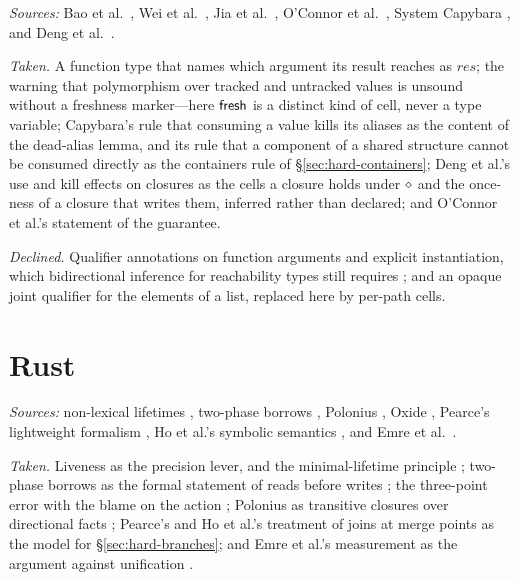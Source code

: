 \emph{Sources:} Bao et al.\ \citep{bao2021reachability}, Wei et al.\ \citep{wei2024polymorphic}, Jia et
al.\ \citep{jia2026escape}, O'Connor et al.\ \citep{oconnor2026separation}, System Capybara
\citep{xu2026capybara}, and Deng et al.\ \citep{deng2025capture}.

\emph{Taken.} A function type that names which argument its result reaches \citep[\S2.2]{wei2024polymorphic}
as $\mathit{res}$; the warning that polymorphism over tracked and untracked values is unsound without a
freshness marker---here $\mathsf{fresh}$ is a distinct kind of cell, never a type variable; Capybara's rule that
consuming a value kills its aliases as the content of the dead-alias lemma, and its rule that a component
of a shared structure cannot be consumed directly as the containers rule of \S\ref{sec:hard-containers};
Deng et al.'s use and kill effects on closures \citep[Fig.~1]{deng2025capture} as the cells a closure
holds under $\diamond$ and the once-ness of a closure that writes them, inferred rather than declared; and
O'Connor et al.'s statement of the guarantee.

\emph{Declined.} Qualifier annotations on function arguments and explicit instantiation, which
bidirectional inference for reachability types still requires \citep{jia2026escape}; and an opaque joint
qualifier for the elements of a list, replaced here by per-path cells.

\section{Rust}

\emph{Sources:} non-lexical lifetimes \citep{rfc2094}, two-phase borrows \citep{rfc2025}, Polonius
\citep{matsakis2018alias,stjerna2020polonius}, Oxide \citep{weiss2019oxide}, Pearce's lightweight formalism
\citep{pearce2021lightweight}, Ho et al.'s symbolic semantics \citep{ho2024sound}, and Emre et al.\
\citep{emre2023aliasing}.

\emph{Taken.} Liveness as the precision lever, and the minimal-lifetime principle \citep{rfc2094};
two-phase borrows as the formal statement of reads before writes \citep{rfc2025}; the three-point error
with the blame on the action \citep{rfc2094}; Polonius as transitive closures over directional facts
\citep{matsakis2018alias,stjerna2020polonius}; Pearce's and Ho et al.'s treatment of joins at merge points as the model for
\S\ref{sec:hard-branches}; and Emre et al.'s measurement as the argument against unification
\citep{emre2023aliasing}.

